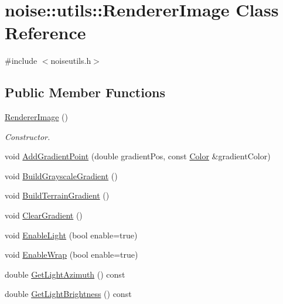 \hypertarget{classnoise_1_1utils_1_1_renderer_image}{\section{noise\+:\+:utils\+:\+:Renderer\+Image Class Reference}
\label{classnoise_1_1utils_1_1_renderer_image}
}


{\ttfamily \#include $<$noiseutils.\+h$>$}

\subsection*{Public Member Functions}
\begin{DoxyCompactItemize}
\item 
\hyperlink{classnoise_1_1utils_1_1_renderer_image_a9184e92282c04ab094a30c21db22d1d2}{Renderer\+Image} ()
\begin{DoxyCompactList}\small\item\em Constructor. \end{DoxyCompactList}\item 
void \hyperlink{classnoise_1_1utils_1_1_renderer_image_a075cb17fcaf8e329f20e6fa9d1a7cb99}{Add\+Gradient\+Point} (double gradient\+Pos, const \hyperlink{classnoise_1_1utils_1_1_color}{Color} \&gradient\+Color)
\item 
void \hyperlink{classnoise_1_1utils_1_1_renderer_image_a142542e27fb5ed45919c0e627a5d0967}{Build\+Grayscale\+Gradient} ()
\item 
void \hyperlink{classnoise_1_1utils_1_1_renderer_image_ab7c7c7127f53bd39390e9e864abbb51e}{Build\+Terrain\+Gradient} ()
\item 
void \hyperlink{classnoise_1_1utils_1_1_renderer_image_afe260224d641c078b83d1a403478b809}{Clear\+Gradient} ()
\item 
void \hyperlink{classnoise_1_1utils_1_1_renderer_image_a132794038f83055070281eadc54321ba}{Enable\+Light} (bool enable=true)
\item 
void \hyperlink{classnoise_1_1utils_1_1_renderer_image_a31c0090f0bcd8ccf445ae772c99af3cf}{Enable\+Wrap} (bool enable=true)
\item 
double \hyperlink{classnoise_1_1utils_1_1_renderer_image_a24dfd02bc331dbbbea3c3c6bdc75eca4}{Get\+Light\+Azimuth} () const 
\item 
double \hyperlink{classnoise_1_1utils_1_1_renderer_image_a445e457b2dc99d029800b3b5ee4b8489}{Get\+Light\+Brightness} () const 
\item 

\end{DoxyCompactItemize}
